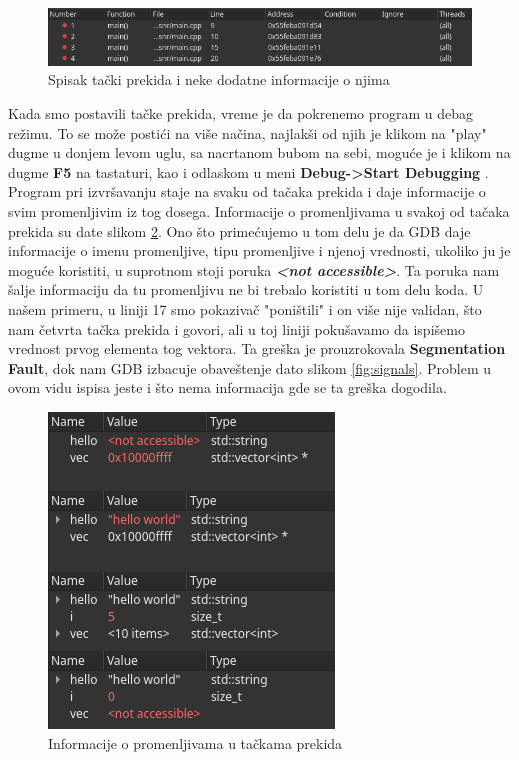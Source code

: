 \documentclass[a4paper]{article}
\begin{document}
\begin{figure}[h!]
\begin{center}
\includegraphics[scale=0.7]{breakpoints_list.png}
\end{center}
\caption{Spisak tački prekida i neke dodatne informacije o njima}
\label{fig:points_list}
\end{figure}

Kada smo postavili tačke prekida, vreme je da pokrenemo program u debag režimu. To se može postići na više načina,
najlakši od njih je klikom na "play" dugme u donjem levom uglu, sa nacrtanom bubom na sebi, moguće je i klikom na 
dugme \textbf{F5} na tastaturi, kao i odlaskom u meni \textbf{Debug->Start Debugging} \cite{QT}.
\\

Program pri izvršavanju staje na svaku od tačaka prekida i daje informacije o svim promenljivim iz tog dosega. 
Informacije o promenljivama u svakoj od tačaka prekida su date slikom \ref{fig:points_res}. 
Ono što primećujemo u tom delu je da GDB daje informacije o imenu promenljive, tipu promenljive i njenoj vrednosti, 
ukoliko ju je moguće koristiti, u suprotnom stoji poruka \textbf{\textit{<not accessible>}}. Ta poruka nam šalje
informaciju da tu promenljivu ne bi trebalo koristiti u tom delu koda. U našem primeru, u liniji 17 smo pokazivač "poništili" 
i on više nije validan, što nam četvrta tačka prekida i govori, ali u toj liniji pokušavamo da ispišemo vrednost prvog elementa
tog vektora. Ta greška je prouzrokovala \textbf{Segmentation Fault}, dok nam GDB izbacuje obaveštenje dato slikom \ref{fig:signals}.
Problem u ovom vidu ispisa jeste i što nema informacija gde se ta greška dogodila.

\begin{figure}[h!]
\begin{center}
\includegraphics[scale=0.5]{breakpoints_res.png}
\end{center}
\caption{Informacije o promenljivama u tačkama prekida}
\label{fig:points_res}
\end{figure}
\end{document}
